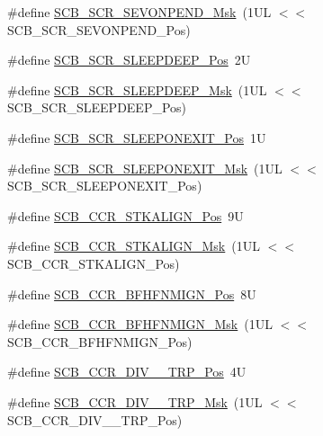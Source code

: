 \begin{DoxyCompactItemize}
\#define \hyperlink{group___c_m_s_i_s___s_c_b_gafb98656644a14342e467505f69a997c9}{S\-C\-B\-\_\-\-S\-C\-R\-\_\-\-S\-E\-V\-O\-N\-P\-E\-N\-D\-\_\-\-Msk}~(1\-U\-L $<$$<$ S\-C\-B\-\_\-\-S\-C\-R\-\_\-\-S\-E\-V\-O\-N\-P\-E\-N\-D\-\_\-\-Pos)
\item 
\#define \hyperlink{group___c_m_s_i_s___s_c_b_gab304f6258ec03bd9a6e7a360515c3cfe}{S\-C\-B\-\_\-\-S\-C\-R\-\_\-\-S\-L\-E\-E\-P\-D\-E\-E\-P\-\_\-\-Pos}~2\-U
\item 
\#define \hyperlink{group___c_m_s_i_s___s_c_b_ga77c06a69c63f4b3f6ec1032e911e18e7}{S\-C\-B\-\_\-\-S\-C\-R\-\_\-\-S\-L\-E\-E\-P\-D\-E\-E\-P\-\_\-\-Msk}~(1\-U\-L $<$$<$ S\-C\-B\-\_\-\-S\-C\-R\-\_\-\-S\-L\-E\-E\-P\-D\-E\-E\-P\-\_\-\-Pos)
\item 
\#define \hyperlink{group___c_m_s_i_s___s_c_b_ga3680a15114d7fdc1e25043b881308fe9}{S\-C\-B\-\_\-\-S\-C\-R\-\_\-\-S\-L\-E\-E\-P\-O\-N\-E\-X\-I\-T\-\_\-\-Pos}~1\-U
\item 
\#define \hyperlink{group___c_m_s_i_s___s_c_b_ga50a243e317b9a70781b02758d45b05ee}{S\-C\-B\-\_\-\-S\-C\-R\-\_\-\-S\-L\-E\-E\-P\-O\-N\-E\-X\-I\-T\-\_\-\-Msk}~(1\-U\-L $<$$<$ S\-C\-B\-\_\-\-S\-C\-R\-\_\-\-S\-L\-E\-E\-P\-O\-N\-E\-X\-I\-T\-\_\-\-Pos)
\item 
\#define \hyperlink{group___c_m_s_i_s___s_c_b_gac2d20a250960a432cc74da59d20e2f86}{S\-C\-B\-\_\-\-C\-C\-R\-\_\-\-S\-T\-K\-A\-L\-I\-G\-N\-\_\-\-Pos}~9\-U
\item 
\#define \hyperlink{group___c_m_s_i_s___s_c_b_ga33cf22d3d46af158a03aad25ddea1bcb}{S\-C\-B\-\_\-\-C\-C\-R\-\_\-\-S\-T\-K\-A\-L\-I\-G\-N\-\_\-\-Msk}~(1\-U\-L $<$$<$ S\-C\-B\-\_\-\-C\-C\-R\-\_\-\-S\-T\-K\-A\-L\-I\-G\-N\-\_\-\-Pos)
\item 
\#define \hyperlink{group___c_m_s_i_s___s_c_b_ga4010a4f9e2a745af1b58abe1f791ebbf}{S\-C\-B\-\_\-\-C\-C\-R\-\_\-\-B\-F\-H\-F\-N\-M\-I\-G\-N\-\_\-\-Pos}~8\-U
\item 
\#define \hyperlink{group___c_m_s_i_s___s_c_b_ga89a28cc31cfc7d52d9d7a8fcc69c7eac}{S\-C\-B\-\_\-\-C\-C\-R\-\_\-\-B\-F\-H\-F\-N\-M\-I\-G\-N\-\_\-\-Msk}~(1\-U\-L $<$$<$ S\-C\-B\-\_\-\-C\-C\-R\-\_\-\-B\-F\-H\-F\-N\-M\-I\-G\-N\-\_\-\-Pos)
\item 
\#define \hyperlink{group___c_m_s_i_s___s_c_b_gac8d512998bb8cd9333fb7627ddf59bba}{S\-C\-B\-\_\-\-C\-C\-R\-\_\-\-D\-I\-V\-\_\-\_\-\-T\-R\-P\-\_\-\-Pos}~4\-U
\item 
\#define \hyperlink{group___c_m_s_i_s___s_c_b_gabb9aeac71b3abd8586d0297070f61dcb}{S\-C\-B\-\_\-\-C\-C\-R\-\_\-\-D\-I\-V\-\_\-\_\-\-T\-R\-P\-\_\-\-Msk}~(1\-U\-L $<$$<$ S\-C\-B\-\_\-\-C\-C\-R\-\_\-\-D\-I\-V\-\_\-\_\-\-T\-R\-P\-\_\-\-Pos)

\end{DoxyCompactItemize}
